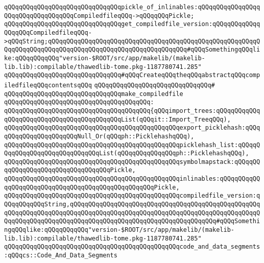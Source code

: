 \verb|qQQqqQQqqQQqqQQqqQQqqQQqqQQqqQQqpickle_of_inlinables:qQQqqQQqqQQqqQQqqQQqqQQqqQQqqQQqqQQqCompiledfileqQQq->qQQqqQQqPickle;|\newline
\newline
\verb|qQQqqQQqqQQqqQQqqQQqqQQqqQQqqQQqget_compiledfile_version:qQQqqQQqqQQqqQQqqQQqCompiledfileqQQq->qQQqString;qQQqqQQqqQQqqQQqqQQqqQQqqQQqqQQqqQQqqQQqqQQqqQQqqQQqqQQqqQQqqQQqqQQqqQQqqQQqqQQqqQQqqQQqqQQqqQQqqQQqqQQqqQQq#qQQqSomethingqQQqlike:qQQqqQQqqQQq"version-$ROOT/src/app/makelib/(makelib-lib.lib):compilable/thawedlib-tome.pkg-1187780741.285"|\newline
\newline
\newline
\newline
\verb|qQQqqQQqqQQqqQQqqQQqqQQqqQQqqQQq#qQQqCreateqQQqtheqQQqabstractqQQqcompiledfileqQQqcontentsqQQq|\newline
\verb|qQQqqQQqqQQqqQQqqQQqqQQqqQQqqQQq#|\newline
\verb|qQQqqQQqqQQqqQQqqQQqqQQqqQQqqQQqmake_compiledfile|\newline
\verb|qQQqqQQqqQQqqQQqqQQqqQQqqQQqqQQqqQQqqQQq:|\newline
\verb|qQQqqQQqqQQqqQQqqQQqqQQqqQQqqQQqqQQqqQQq{qQQqimport_trees:qQQqqQQqqQQqqQQqqQQqqQQqqQQqqQQqqQQqqQQqqQQqList(qQQqit::Import_TreeqQQq),|\newline
\verb|qQQqqQQqqQQqqQQqqQQqqQQqqQQqqQQqqQQqqQQqqQQqqQQqexport_picklehash:qQQqqQQqqQQqqQQqqQQqqQQqNull_Or(qQQqph::PicklehashqQQq),|\newline
\verb|qQQqqQQqqQQqqQQqqQQqqQQqqQQqqQQqqQQqqQQqqQQqqQQqpicklehash_list:qQQqqQQqqQQqqQQqqQQqqQQqqQQqqQQqList(qQQqqQQqqQQqqQQqph::PicklehashqQQq),|\newline
\verb|qQQqqQQqqQQqqQQqqQQqqQQqqQQqqQQqqQQqqQQqqQQqqQQqsymbolmapstack:qQQqqQQqqQQqqQQqqQQqqQQqqQQqqQQqqQQqPickle,|\newline
\verb|qQQqqQQqqQQqqQQqqQQqqQQqqQQqqQQqqQQqqQQqqQQqqQQqinlinables:qQQqqQQqqQQqqQQqqQQqqQQqqQQqqQQqqQQqqQQqqQQqqQQqqQQqPickle,|\newline
\verb|qQQqqQQqqQQqqQQqqQQqqQQqqQQqqQQqqQQqqQQqqQQqqQQqcompiledfile_version:qQQqqQQqqQQqString,qQQqqQQqqQQqqQQqqQQqqQQqqQQqqQQqqQQqqQQqqQQqqQQqqQQqqQQqqQQqqQQqqQQqqQQqqQQqqQQqqQQqqQQqqQQqqQQqqQQqqQQqqQQqqQQqqQQqqQQqqQQqqQQqqQQqqQQqqQQqqQQqqQQqqQQqqQQqqQQqqQQqqQQqqQQqqQQqqQQq#qQQqSomethingqQQqlike:qQQqqQQqqQQq"version-$ROOT/src/app/makelib/(makelib-lib.lib):compilable/thawedlib-tome.pkg-1187780741.285"|\newline
\verb|qQQqqQQqqQQqqQQqqQQqqQQqqQQqqQQqqQQqqQQqqQQqqQQqcode_and_data_segments:qQQqcs::Code_And_Data_Segments|\newline
